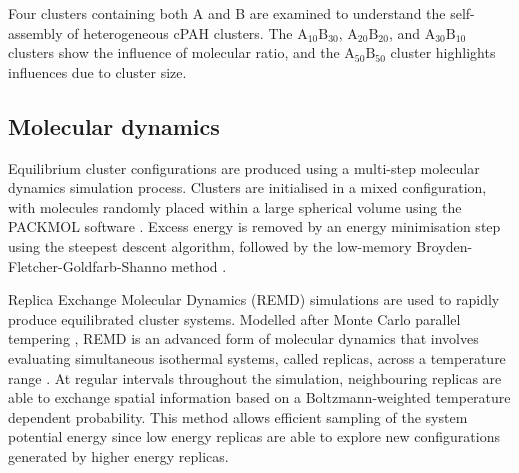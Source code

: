 Four clusters containing both A and B are examined to understand the self-assembly of heterogeneous cPAH clusters. The $\text{A}_{\text{10}}\text{B}_{\text{30}}$, $\text{A}_{\text{20}}\text{B}_{\text{20}}$, and  $\text{A}_{\text{30}}\text{B}_{\text{10}}$ clusters show the influence of molecular ratio, and the $\text{A}_{\text{50}}\text{B}_{\text{50}}$ cluster highlights influences due to cluster size. 

\subsection{Molecular dynamics}
Equilibrium cluster configurations are produced using a multi-step molecular dynamics simulation process. Clusters are initialised in a mixed configuration, with molecules randomly placed within a large spherical volume using the PACKMOL software \cite{Martinez2009PACKMOL}. Excess energy is removed by an energy minimisation step using the steepest descent algorithm, followed by the low-memory Broyden-Fletcher-Goldfarb-Shanno method \cite{L-BFGS}.

Replica Exchange Molecular Dynamics (REMD) simulations are used to rapidly produce equilibrated cluster systems. Modelled after Monte Carlo parallel tempering \cite{Hukushima1996}, REMD is an advanced form of molecular dynamics that involves evaluating simultaneous isothermal systems, called replicas, across a temperature range \cite{Sugita1999}. At regular intervals throughout the simulation, neighbouring replicas are able to exchange spatial information based on a Boltzmann-weighted temperature dependent probability. This method allows efficient sampling of the system potential energy since low energy replicas are able to explore new configurations generated by higher energy replicas. 

